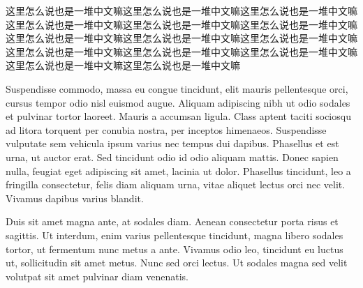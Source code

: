 \makelettertitle

\begin{cvletter}

这里怎么说也是一堆中文嘛这里怎么说也是一堆中文嘛这里怎么说也是一堆中文嘛这里怎么说也是一堆中文嘛这里怎么说也是一堆中文嘛这里怎么说也是一堆中文嘛这里怎么说也是一堆中文嘛这里怎么说也是一堆中文嘛这里怎么说也是一堆中文嘛这里怎么说也是一堆中文嘛这里怎么说也是一堆中文嘛这里怎么说也是一堆中文嘛这里怎么说也是一堆中文嘛这里怎么说也是一堆中文嘛

Suspendisse commodo, massa eu congue tincidunt, elit mauris pellentesque orci, cursus tempor odio nisl euismod augue. Aliquam adipiscing nibh ut odio sodales et pulvinar tortor laoreet. Mauris a accumsan ligula. Class aptent taciti sociosqu ad litora torquent per conubia nostra, per inceptos himenaeos. Suspendisse vulputate sem vehicula ipsum varius nec tempus dui dapibus. Phasellus et est urna, ut auctor erat. Sed tincidunt odio id odio aliquam mattis. Donec sapien nulla, feugiat eget adipiscing sit amet, lacinia ut dolor. Phasellus tincidunt, leo a fringilla consectetur, felis diam aliquam urna, vitae aliquet lectus orci nec velit. Vivamus dapibus varius blandit.

Duis sit amet magna ante, at sodales diam. Aenean consectetur porta risus et sagittis. Ut interdum, enim varius pellentesque tincidunt, magna libero sodales tortor, ut fermentum nunc metus a ante. Vivamus odio leo, tincidunt eu luctus ut, sollicitudin sit amet metus. Nunc sed orci lectus. Ut sodales magna sed velit volutpat sit amet pulvinar diam venenatis.

\end{cvletter}


\makeletterclosing
